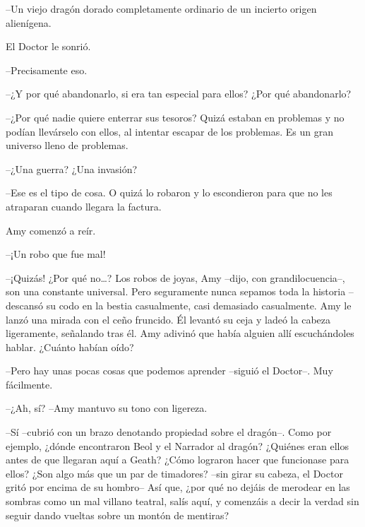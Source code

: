 {--Un viejo dragón dorado completamente ordinario de un incierto
origen alienígena.}

{El Doctor le sonrió.}

{--Precisamente eso.}

{--¿Y por qué abandonarlo, si era tan especial para ellos? ¿Por qué
abandonarlo?}

{--¿Por qué nadie quiere enterrar sus tesoros? Quizá estaban en
	problemas y no podían llevárselo con ellos, al intentar escapar de los
problemas. Es un gran universo lleno de problemas.}

{--¿Una guerra? ¿Una invasión?}

{--Ese es el tipo de cosa. O quizá lo robaron y lo escondieron para
que no les atraparan cuando llegara la factura.}

{Amy comenzó a reír.}

{--¡Un robo que fue mal!}

{--¡Quizás! ¿Por qué no\ldots{}? Los robos de joyas, Amy --dijo, con
	grandilocuencia--, son una constante universal. Pero seguramente nunca
	sepamos toda la historia --descansó su codo en la bestia casualmente,
	casi demasiado casualmente. Amy le lanzó una mirada con el ceño
	fruncido. Él levantó su ceja y ladeó la cabeza ligeramente, señalando
	tras él. Amy adivinó que había alguien allí escuchándoles hablar.
¿Cuánto habían oído?}

{--Pero hay unas pocas cosas que podemos aprender --siguió el
Doctor--. Muy fácilmente.}

{--¿Ah, sí? --Amy mantuvo su tono con ligereza.}

{--Sí --cubrió con un brazo denotando propiedad sobre el dragón--.
	Como por ejemplo, ¿dónde encontraron Beol y el Narrador al dragón?
	¿Quiénes eran ellos antes de que llegaran aquí a Geath? ¿Cómo lograron
	hacer que funcionase para ellos? ¿Son algo más que un par de timadores?
	--sin girar su cabeza, el Doctor gritó por encima de su hombro-- Así
	que, ¿por qué no dejáis de merodear en las sombras como un mal villano
	teatral, salís aquí, y comenzáis a decir la verdad sin seguir dando
vueltas sobre un montón de mentiras?}
